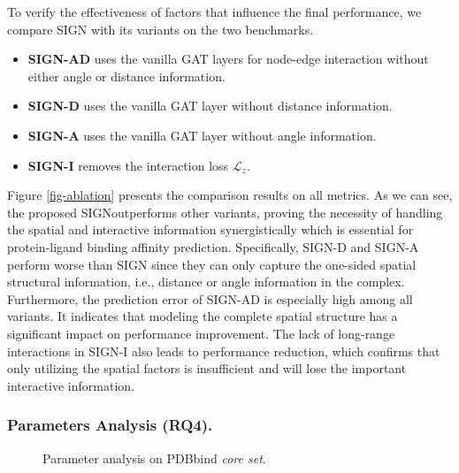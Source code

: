 \documentclass[sigconf]{acmart}
\newcommand{\B}[1]{{\bfseries #1}}
\newcommand{\model}{\textsf{SIGN}\xspace}
\begin{document}
To verify the effectiveness of factors that influence the final performance, we compare \model with its variants on the two benchmarks.
\begin{itemize}[leftmargin=*,topsep=1pt]
    \item \B{\textsf{\model-AD}} uses the vanilla GAT layers for node-edge interaction without either angle or distance information.
    \item \B{\textsf{\model-D}} uses the vanilla GAT layer without distance information.
    \item \B{\textsf{\model-A}} uses the vanilla GAT layer without angle information.
    \item \B{\textsf{\model-I}} removes the interaction loss $\mathcal{L}_z$.
\end{itemize}
Figure \ref{fig-ablation} presents the comparison results on all metrics. As we can see, the proposed \model {}outperforms other variants, proving the necessity of handling the spatial and interactive information synergistically which is essential for protein-ligand binding affinity prediction. Specifically, \textsf{\model-D} and \textsf{\model-A} perform worse than \model since they can only capture the one-sided spatial structural information, i.e., distance or angle information in the complex. Furthermore, the prediction error of \textsf{\model-AD} is especially high among all variants. It indicates that modeling the complete spatial structure has a significant impact on performance improvement. The lack of long-range interactions in \textsf{\model-I} also leads to performance reduction, which confirms that only utilizing the spatial factors is insufficient and will lose the important interactive information.

\subsubsection{Parameters Analysis (RQ4).}
\label{sec-para-analy}

\begin{figure}
\setlength{\abovecaptionskip}{2.mm}
\setlength{\belowcaptionskip}{-0.cm}
  \centering
  \vspace{-2mm}
  \caption{Parameter analysis on PDBbind \textit{core set}.}
  \vspace{-6mm}
  \label{fig-parameter} \end{figure}
\end{document}
